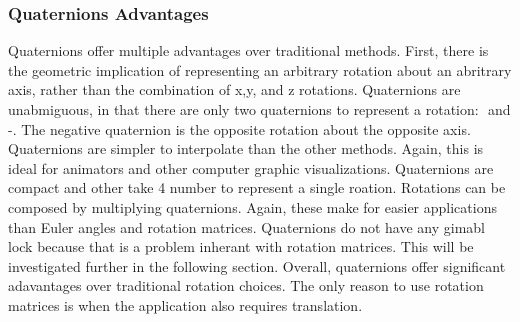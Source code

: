 \subsubsection{Quaternions Advantages}
Quaternions offer multiple advantages over traditional methods.
First, there is the geometric implication of representing an arbitrary rotation about an abritrary axis, rather than the combination of x,y, and z rotations.
Quaternions are unabmiguous, in that there are only two quaternions to represent a rotation: \qq$ $ and -\qq$ $.
The negative quaternion is the opposite rotation about the opposite axis.
Quaternions are simpler to interpolate than the other methods.
Again, this is ideal for animators and other computer graphic visualizations.
Quaternions are compact and other take 4 number to represent a single roation.
Rotations can be composed by multiplying quaternions.
Again, these make for easier applications than Euler angles and rotation matrices.
Quaternions do not have any gimabl lock because that is a problem inherant with rotation matrices.
This will be investigated further in the following section.
Overall, quaternions offer significant adavantages over traditional rotation choices.
The only reason to use rotation matrices is when the application also requires translation.
